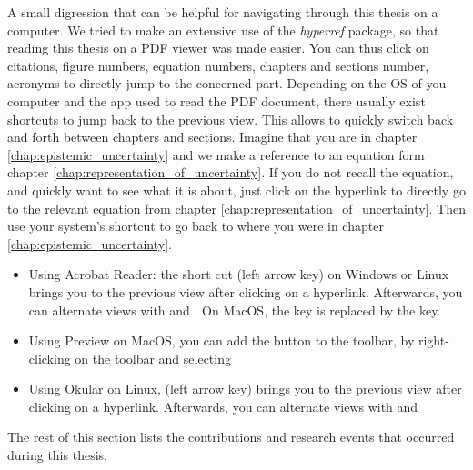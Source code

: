 \begin{remark}
    A small digression that can be helpful for navigating through this thesis on a computer. We tried to make an extensive use of the \textit{hyperref} package, so that reading this thesis on a PDF viewer was made easier. You can thus click on citations, figure numbers, equation numbers, chapters and sections number, acronyms \etc to directly jump to the concerned part. Depending on the OS of you computer and the app used to read the PDF document, there usually exist shortcuts to jump back to the previous view. This allows to quickly switch back and forth between chapters and sections. Imagine that you are in chapter \ref{chap:epistemic_uncertainty} and we make a reference to an equation form chapter \ref{chap:representation_of_uncertainty}. If you do not recall the equation, and quickly want to see what it is about, just click on the hyperlink to directly go to the relevant equation from chapter \ref{chap:representation_of_uncertainty}. Then use your system's shortcut to go back to where you were in chapter \ref{chap:epistemic_uncertainty}. 
    \begin{itemize}
        \item Using Acrobat Reader: the short cut \keys{\Altwin + \arrowkeyleft} (left arrow key) on Windows or Linux brings you to the previous view after clicking on a hyperlink. Afterwards, you can alternate views with \keys{\Altwin + \arrowkeyright} and \keys{\Altwin + \arrowkeyleft}. On MacOS, the \keys{\Altwin} key is replaced by the \keys{\cmd} key.
        \item Using Preview on MacOS, you can add the  button to the toolbar, by right-clicking on the toolbar and selecting 
        \item Using Okular on Linux, \keys{\Altwin + \shift + \arrowkeyleft} (left arrow key) brings you to the previous view after clicking on a hyperlink. Afterwards, you can alternate views with \keys{\Altwin + \shift + \arrowkeyright} and \keys{\Altwin + \shift + \arrowkeyleft}
    \end{itemize}
\end{remark}

The rest of this section lists the contributions and research events that occurred during this thesis.

